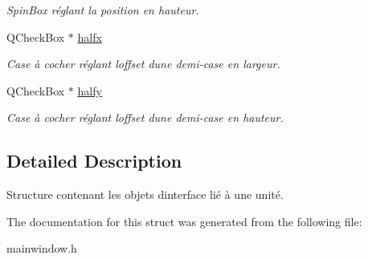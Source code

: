 \begin{DoxyCompactItemize}
\begin{DoxyCompactList}\small\item\em Spin\+Box réglant la position en hauteur. \end{DoxyCompactList}\item 
\hypertarget{structunit_widget_set__str_aab1c1c43fafcd7062fa8cfd4136a30b6}{}Q\+Check\+Box $\ast$ \hyperlink{structunit_widget_set__str_aab1c1c43fafcd7062fa8cfd4136a30b6}{halfx}\label{structunit_widget_set__str_aab1c1c43fafcd7062fa8cfd4136a30b6}

\begin{DoxyCompactList}\small\item\em Case à cocher réglant l\textquotesingle{}offset d\textquotesingle{}une demi-\/case en largeur. \end{DoxyCompactList}\item 
\hypertarget{structunit_widget_set__str_a7ff01fa2c0ada654b42896842a0ab5f4}{}Q\+Check\+Box $\ast$ \hyperlink{structunit_widget_set__str_a7ff01fa2c0ada654b42896842a0ab5f4}{halfy}\label{structunit_widget_set__str_a7ff01fa2c0ada654b42896842a0ab5f4}

\begin{DoxyCompactList}\small\item\em Case à cocher réglant l\textquotesingle{}offset d\textquotesingle{}une demi-\/case en hauteur. \end{DoxyCompactList}\end{DoxyCompactItemize}


\subsection{Detailed Description}
Structure contenant les objets d\textquotesingle{}interface lié à une unité. 

The documentation for this struct was generated from the following file\+:\begin{DoxyCompactItemize}
\item 
mainwindow.\+h\end{DoxyCompactItemize}

